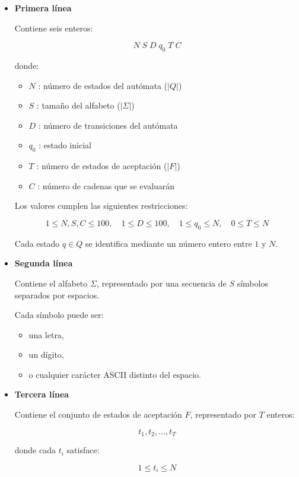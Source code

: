 \documentclass[12pt]{article}
\begin{document}
\begin{itemize}

\item \textbf{Primera línea}

Contiene seis enteros:

\[
N\; S\; D\; q_0\; T\; C
\]

donde:

\begin{itemize}

\item $N$ : número de estados del autómata ($|Q|$)
\item $S$ : tamaño del alfabeto ($|\Sigma|$)
\item $D$ : número de transiciones del autómata
\item $q_0$ : estado inicial
\item $T$ : número de estados de aceptación ($|F|$)
\item $C$ : número de cadenas que se evaluarán

\end{itemize}

Los valores cumplen las siguientes restricciones:

\[
1 \leq N,S,C \leq 100, \quad 1 \leq D \leq 100, \quad 1 \leq q_0 \leq N, \quad 0 \leq T \leq N
\]

Cada estado $q \in Q$ se identifica mediante un número entero entre $1$ y $N$.

\item \textbf{Segunda línea}

Contiene el alfabeto $\Sigma$, representado por una secuencia de $S$ símbolos separados por espacios.  

Cada símbolo puede ser:

\begin{itemize}
\item una letra,
\item un dígito,
\item o cualquier carácter ASCII distinto del espacio.
\end{itemize}

\item \textbf{Tercera línea}

Contiene el conjunto de estados de aceptación $F$, representado por $T$ enteros:

\[
t_1, t_2, ..., t_T
\]

donde cada $t_i$ satisface:

\[
1 \leq t_i \leq N
\]


\end{itemize}
\end{document}
